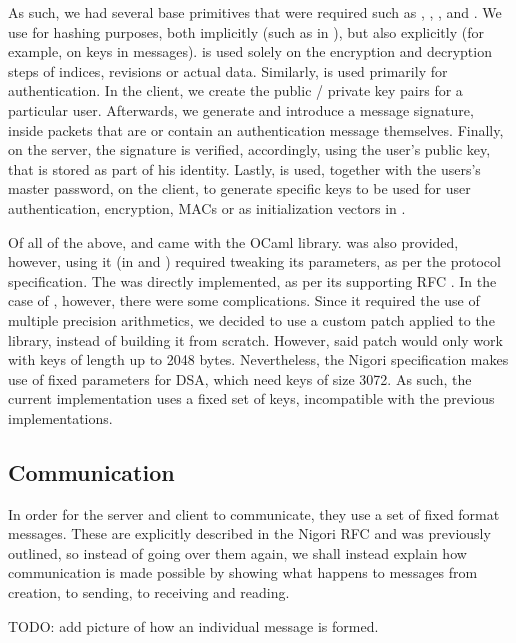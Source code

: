 As such, we had several base primitives that were required such as , , ,  and .
We use  for hashing purposes, both implicitly (such as in ), but also explicitly (for example, on  keys in messages).
 is used solely on the encryption and decryption steps of indices, revisions or actual data.
Similarly,  is used primarily for authentication.
In the client, we create the public / private key pairs for a particular user.
Afterwards, we generate and introduce a message signature, inside packets that are or contain an authentication message themselves.
Finally, on the server, the signature is verified, accordingly, using the user's public key, that is stored as part of his identity.
Lastly,  is used, together with the users's master password, on the client, to generate specific keys to be used for user authentication, encryption, MACs or as initialization vectors in .

Of all of the above,  and  came with the OCaml  library.
 was also provided, however, using it (in  and ) required tweaking its parameters, as per the protocol specification.
The  was directly implemented, as per its supporting RFC \cite{RFC2898}.
In the case of , however, there were some complications.
Since it required the use of multiple precision arithmetics, we decided to use a custom patch applied to the  library, instead of building it from scratch.
However, said patch would only work with keys of length up to 2048 bytes.
Nevertheless, the Nigori specification makes use of fixed parameters for DSA, which need keys of size 3072.
As such, the current implementation uses a fixed set of keys, incompatible with the previous implementations.

\subsection{Communication}
In order for the server and client to communicate, they use a set of fixed format messages.
These are explicitly described in the Nigori RFC and was previously outlined, so instead of going over them again, we shall instead explain how communication is made possible by showing what happens to messages from creation, to sending, to receiving and reading.

TODO: add picture of how an individual message is formed.

